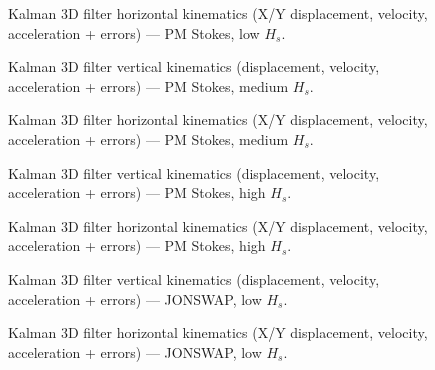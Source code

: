 \documentclass[11pt,letterpaper]{article}
\begin{document}
    \begin{figure}[H]\centering
    \resizebox{\textwidth}{!}{}
    \caption{Kalman 3D filter horizontal kinematics (X/Y displacement, velocity, acceleration + errors) — PM Stokes, low $H_s$.}
    \label{fig:w3d_ou3_pmstokes_low_xykin}
    \end{figure}

    \begin{figure}[H]\centering
    \resizebox{\textwidth}{!}{}
    \caption{Kalman 3D filter vertical kinematics (displacement, velocity, acceleration + errors) — PM Stokes, medium $H_s$.}
    \label{fig:w3d_ou3_pmstokes_medium_zkin}
    \end{figure}

    \begin{figure}[H]\centering
    \resizebox{\textwidth}{!}{}
    \caption{Kalman 3D filter horizontal kinematics (X/Y displacement, velocity, acceleration + errors) — PM Stokes, medium $H_s$.}
    \label{fig:w3d_ou3_pmstokes_medium_xykin}
    \end{figure}

    \begin{figure}[H]\centering
    \resizebox{\textwidth}{!}{}
    \caption{Kalman 3D filter vertical kinematics (displacement, velocity, acceleration + errors) — PM Stokes, high $H_s$.}
    \label{fig:w3d_ou3_pmstokes_high_zkin}
    \end{figure}

    \begin{figure}[H]\centering
    \resizebox{\textwidth}{!}{}
    \caption{Kalman 3D filter horizontal kinematics (X/Y displacement, velocity, acceleration + errors) — PM Stokes, high $H_s$.}
    \label{fig:w3d_ou3_pmstokes_high_xykin}
    \end{figure}

    \begin{figure}[H]\centering
    \resizebox{\textwidth}{!}{}
    \caption{Kalman 3D filter vertical kinematics (displacement, velocity, acceleration + errors) — JONSWAP, low $H_s$.}
    \label{fig:w3d_ou3_jonswap_low_zkin}
    \end{figure}

    \begin{figure}[H]\centering
    \resizebox{\textwidth}{!}{}
    \caption{Kalman 3D filter horizontal kinematics (X/Y displacement, velocity, acceleration + errors) — JONSWAP, low $H_s$.}
    \label{fig:w3d_ou3_jonswap_low_xykin}
    \end{figure}
\end{document}
